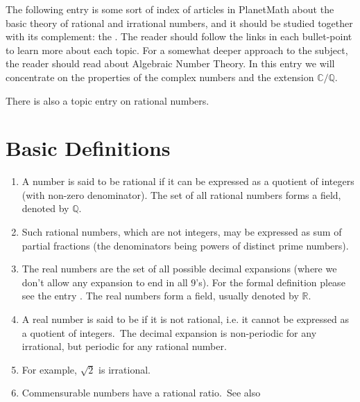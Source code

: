 \documentclass[12pt]{article}
\theoremstyle{definition}
\newcommand{\Reals}{\mathbb{R}}
\newcommand{\Complex}{\mathbb{C}}
\newcommand{\Rats}{\mathbb{Q}}
\begin{document}
The following entry is some sort of index of articles in PlanetMath about the basic theory of rational and irrational numbers, and it should be studied together with its complement: the . The reader should follow the links in each bullet-point to learn more about each topic. For a somewhat deeper approach to the subject, the reader should read about Algebraic Number Theory. In this entry we will concentrate on the properties of the complex numbers and the extension $\Complex/\Rats$.

There is also a topic entry on rational numbers.

\section{Basic Definitions}

\begin{enumerate}
\item A number is said to be rational if it can be expressed as a quotient of integers (with non-zero denominator). The set of all rational numbers forms a field, denoted by $\Rats$. 

\item Such rational numbers, which are not integers, may be expressed as sum of partial fractions (the denominators being powers of distinct prime numbers). 

\item The real numbers are the set of all possible decimal expansions (where we don't allow any expansion to end in all $9$'s). For the formal definition please see the entry . The real numbers form a field, usually denoted by $\Reals$.

\item A real number is said to be  if it is not rational, i.e. it cannot be expressed as a quotient of integers. \,The decimal expansion is non-periodic for any irrational, but periodic for any rational number.

\item For example, $\sqrt{2}$ is irrational.

\item Commensurable numbers have a rational ratio.\, See also 

\end{enumerate}
\end{document}
